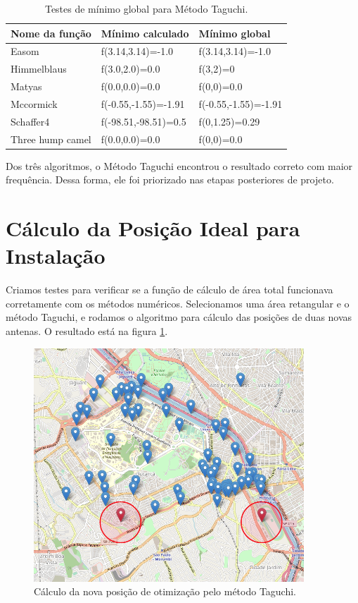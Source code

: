 \documentclass[]{politex}
\begin{document}
\begin{table}[H]
\centering
\begin{tabular}{l|l|l}
Nome da função & Mínimo calculado & Mínimo global \\ \hline
Easom  &  f(3.14,3.14)=-1.0  &  f(3.14,3.14)=-1.0 \\
Himmelblaus  &  f(3.0,2.0)=0.0  &  f(3,2)=0 \\
Matyas  &  f(0.0,0.0)=0.0  &  f(0,0)=0.0 \\
Mccormick  &  f(-0.55,-1.55)=-1.91  &  f(-0.55,-1.55)=-1.91 \\
\rowcolor{Gray}
Schaffer4  &  f(-98.51,-98.51)=0.5  &  f(0,1.25)=0.29 \\
Three hump camel  &  f(0.0,0.0)=0.0  &  f(0,0)=0.0 \\
\end{tabular}
\caption{Testes de mínimo global para Método Taguchi.}
\label{table:test-taguchi}
\end{table}

Dos três algoritmos, o Método Taguchi encontrou o resultado correto com maior
frequência. Dessa forma, ele foi priorizado nas etapas posteriores de projeto.

\section{Cálculo da Posição Ideal para Instalação}
Criamos testes para verificar se a função de cálculo de área total funcionava
corretamente com os métodos numéricos.
Selecionamos uma área retangular e o método Taguchi, e rodamos
o algoritmo para cálculo das posições de duas novas antenas. O resultado está
na figura \ref{fig:taguchi_exemplo}.

\begin{figure}[H]
    \centering
    \includegraphics[width=4in]{imagens/taguchi-exemplo}
    \caption{Cálculo da nova posição de otimização pelo método Taguchi.}
    \label{fig:taguchi_exemplo}
\end{figure}
\end{document}
